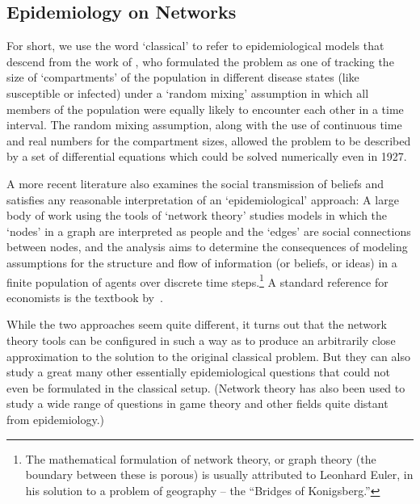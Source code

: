 \subsection{Epidemiology on Networks}

    For short, we use the word `classical' to refer to epidemiological models that descend from the work of \cite{kermack_contribution_1927}, who formulated the problem as one of tracking the size of `compartments' of the population in different disease states (like susceptible or infected) under a `random mixing' assumption in which all members of the population were equally likely to encounter each other in a time interval.  The random mixing assumption, along with the use of continuous time and real numbers for the compartment sizes, allowed the problem to be described by a set of differential equations which could be solved numerically even in 1927.

    A more recent literature also examines the social transmission of beliefs and satisfies any reasonable interpretation of  an `epidemiological' approach:  A large body of work using the tools of `network theory' studies models in which the `nodes' in a graph are interpreted as people and the `edges' are social connections between nodes, and the analysis aims to determine the consequences of modeling assumptions for the structure and flow of information (or beliefs, or ideas) in a finite population of agents over discrete time steps.\footnote{The mathematical formulation of network theory, or graph theory (the boundary between these is porous) is usually attributed to Leonhard Euler, in his solution to a problem of geography -- the ``Bridges of Konigsberg.''}  A standard reference for economists is the textbook by~\cite{jackson_social_2010}.

    While the two approaches seem quite different, it turns out that the network theory tools can be configured in such a way as to produce an arbitrarily close approximation to the solution to the original classical problem.  But they can also study a great many other essentially epidemiological questions that could not even be formulated in the classical setup.  (Network theory has also been used to study a wide range of questions in game theory and other fields quite distant from epidemiology.)

